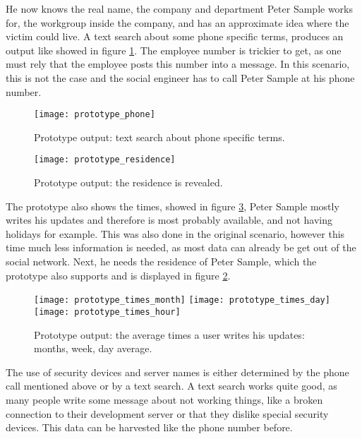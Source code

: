 He now knows the real name, the
company and department Peter Sample works for, the workgroup inside the
company, and has an approximate idea where the victim could live. A text search
about some phone specific terms, produces an output like showed in figure
\ref{fig:prototype_phone}. The employee number is trickier to get, as one must
rely that the employee posts this number into a message. In this scenario, this
is not the case and the social engineer has to call Peter Sample at his phone
number.

\begin{figure}[htb]
  \begin{center}
    \texttt{[image: prototype\_phone]}
    \caption{Prototype output: text search about phone specific terms.}
    \label{fig:prototype_phone}
  \end{center}
\end{figure}


\begin{figure}[htb]
  \begin{center}
    \texttt{[image: prototype\_residence]}
    \caption{Prototype output: the residence is revealed.}
    \label{fig:prototype_residence}
  \end{center}
\end{figure}
The prototype also shows the times, showed in figure
\ref{fig:prototype_times}, Peter Sample mostly writes his
updates and therefore is most probably available, and not having holidays for
example. This was also done in the original scenario, however this time much
less information is needed, as most data can already be get out of the social
network. Next, he needs the residence of Peter Sample, which the prototype also
supports and is displayed in figure \ref{fig:prototype_residence}.

\begin{figure}[htb]
  \begin{center}
    \texttt{[image: prototype\_times\_month]} 
    \texttt{[image: prototype\_times\_day]} 
    \texttt{[image: prototype\_times\_hour]}
    \caption{Prototype output: the average times a user writes his updates: months,
    week, day average.}
    \label{fig:prototype_times}
  \end{center}
\end{figure}

The use of security devices and server names is either determined by the phone
call mentioned above or by a text search. A text search works quite good, as
many people write some message about not working things, like a broken
connection to their development server or that they dislike special security
devices. This data can be harvested like the phone number before.

